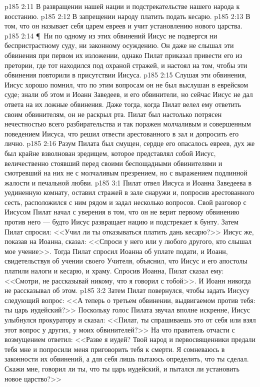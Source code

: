 \vs p185 2:11 \bibnobreakspace В развращении нашей нации и подстрекательстве нашего народа к восстанию.
\vs p185 2:12 \bibnobreakspace В запрещении народу платить подать кесарю.
\vs p185 2:13 \bibnobreakspace В том, что он называет себя царем евреев и учит установлению нового царства.
\vs p185 2:14 \P\ Ни по одному из этих обвинений Иисус не подвергся ни беспристрастному суду, ни законному осуждению. Он даже не слышал эти обвинения при первом их изложении, однако Пилат приказал привести его из претории, где тот находился под охраной стражей, и настоял на том, чтобы эти обвинения повторили в присутствии Иисуса.
\vs p185 2:15 Слушая эти обвинения, Иисус хорошо помнил, что по этим вопросам он не был выслушан в еврейском суде; знали об этом и Иоанн Заведеев, и его обвинители, но сейчас Иисус не дал ответа на их ложные обвинения. Даже тогда, когда Пилат велел ему ответить своим обвинителям, он не раскрыл рта. Пилат был настолько потрясен нечестностью всего разбирательства и так поражен молчаливым и совершенным поведением Иисуса, что решил отвести арестованного в зал и допросить его лично.
\vs p185 2:16 Разум Пилата был смущен, сердце его опасалось евреев, дух же был крайне взволнован зредищем, которое представлял собой Иисус, величественно стоявший перед своими беспощадными обвинителями и смотревший на них не с молчаливым презрением, но с выражением подлинной жалости и печальной любви.
\vs p185 3:1 Пилат отвел Иисуса и Иоанна Заведеева в уединенную комнату, оставил стражей в зале снаружи и, попросив арестованного сесть, расположился с ним рядом и задал несколько вопросов. Свой разговор с Иисусом Пилат начал с уверения в том, что он не верит первому обвинению против него --- будто Иисус развращает нацию и подстрекает к бунту. Затем Пилат спросил: <<Учил ли ты отказываться платить дань кесарю?>> Иисус же, показав на Иоанна, сказал: <<Спроси у него или у любого другого, кто слышал мое учение>>. Тогда Пилат спросил Иоанна об уплате подати, и Иоанн, свидетельствуя об учении своего Учителя, объяснил, что Иисус и его апостолы платили налоги и кесарю, и храму. Спросив Иоанна, Пилат сказал ему: <<Смотри, не рассказывай никому, что я говорил с тобой>>. И Иоанн никогда не рассказывал об этом.
\vs p185 3:2 Затем Пилат повернулся, чтобы задать Иисусу следующий вопрос: <<А теперь о третьем обвинении, выдвигаемом против тебя: ты царь иудейский?>> Поскольку голос Пилата звучал вполне искренне, Иисус улыбнулся прокуратору и сказал: <<Пилат, ты спрашиваешь это от себя или взял этот вопрос у других, у моих обвинителей?>> На что правитель отчасти с возмущением ответил: <<Разве я иудей? Твой народ и первосвященники предали тебя мне и попросили меня приговорить тебя к смерти. Я сомневаюсь в законности их обвинений, а для себя лишь пытаюсь определить, что ты сделал. Скажи мне, говорил ли ты, что ты царь иудейский, и пытался ли установить новое царство?>>
